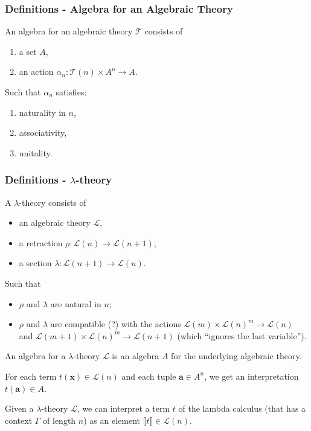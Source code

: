 \documentclass[aspectratio=169]{fancyslides} %
\begin{document}
  \begin{frame}
    \frametitle{Definitions - Algebra for an Algebraic Theory}

    \begin{definition}
      An algebra for an algebraic theory $ \mathcal T $ consists of
      \begin{enumerate}
        \item a set $ A $,
        \item an action $ \alpha_n: \mathcal T(n) \times A^n \to A $.
      \end{enumerate}
      Such that $ \alpha_n $ satisfies:
      \begin{enumerate}
        \item naturality in $ n $,
        \item associativity,
        \item unitality.
      \end{enumerate}
    \end{definition}
  \end{frame}

  \begin{frame}
    \frametitle{Definitions - $ \lambda $-theory}

    \begin{definition}
      A $ \lambda $-theory consists of
      \begin{itemize}
        \item an algebraic theory $ \mathcal L $,
        \item a retraction $ \rho: \mathcal L(n) \to \mathcal L(n + 1) $,
        \item a section $ \lambda: \mathcal L(n + 1) \to \mathcal L(n) $.
      \end{itemize}
      Such that
      \begin{itemize}
        \item $ \rho $ and $ \lambda $ are natural in $ n $;
        \item $ \rho $ and $ \lambda $ are compatible (?) with the actions $ \mathcal L(m) \times \mathcal L(n)^m \to \mathcal L(n) $ and $ \mathcal L(m+1) \times \mathcal L(n)^m \to \mathcal L(n+1) $ (which ``ignores the last variable'').
      \end{itemize}
    \end{definition}

    \pause

    \begin{definition}
      An algebra for a $ \lambda $-theory $ \mathcal L $ is an algebra $ A $ for the underlying algebraic theory.
    \end{definition}

    \pause
    \vfill

    For each term $ t(\mathbf x) \in \mathcal L(n) $ and each tuple $ \mathbf a \in A^n $, we get an interpretation $ t(\mathbf a) \in A $.

    \vfill

    Given a $ \lambda $-theory $ \mathcal L $, we can interpret a term $ t $ of the lambda calculus (that has a context $ \Gamma $ of length $ n $) as an element $ \llbracket t \rrbracket \in \mathcal L(n) $.
  \end{frame}
\end{document}
